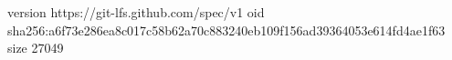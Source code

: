 version https://git-lfs.github.com/spec/v1
oid sha256:a6f73e286ea8c017c58b62a70c883240eb109f156ad39364053e614fd4ae1f63
size 27049
